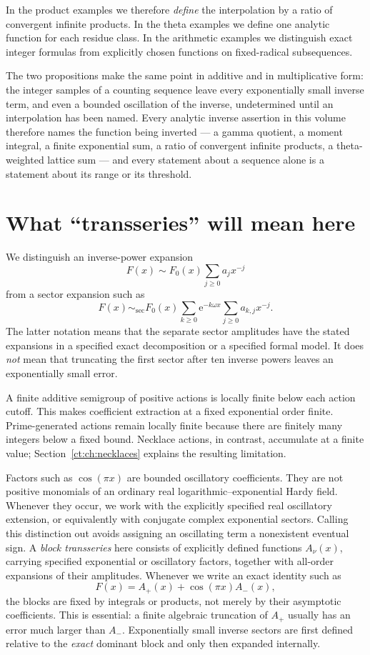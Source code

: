 \documentclass[11pt,openany]{book}
\numberwithin{equation}{chapter}
\theoremstyle{plain}
\theoremstyle{definition}
\theoremstyle{remark}
\newcommand{\ee}{\mathrm e}
\newcommand{\sectorsim}{\mathrel{\sim_{\mathrm{sec}}}}
\begin{document}
In the product examples we therefore \emph{define} the interpolation by a ratio of convergent infinite products. In the theta examples we define one analytic function for each residue class. In the arithmetic examples we distinguish exact integer formulas from explicitly chosen functions on fixed-radical subsequences.

The two propositions make the same point in additive and in multiplicative
form: the integer samples of a counting sequence leave every exponentially
small inverse term, and even a bounded oscillation of the inverse,
undetermined until an interpolation has been named.  Every analytic inverse
assertion in this volume therefore names the function being inverted --- a
gamma quotient, a moment integral, a finite exponential sum, a ratio of
convergent infinite products, a theta-weighted lattice sum --- and every
statement about a sequence alone is a statement about its range or its
threshold.

\section{What ``transseries'' will mean here}
\label{ct:sec:meaning}

We distinguish an inverse-power expansion
\[
 F(x)\sim F_0(x)\sum_{j\ge0}a_jx^{-j}
\]
from a sector expansion such as
\[
 F(x)\sectorsim F_0(x)\sum_{k\ge0}\ee^{-k\omega x}
       \sum_{j\ge0}a_{k,j}x^{-j}.
\]
The latter notation means that the separate sector amplitudes have the stated expansions in a specified exact decomposition or a specified formal model. It does \emph{not} mean that truncating the first sector after ten inverse powers leaves an exponentially small error.

A finite additive semigroup of positive actions is locally finite below each action cutoff. This makes coefficient extraction at a fixed exponential order finite. Prime-generated actions remain locally finite because there are finitely many integers below a fixed bound. Necklace actions, in contrast, accumulate at a finite value; Section~\ref{ct:ch:necklaces} explains the resulting limitation.

Factors such as $\cos(\pi x)$ are bounded oscillatory coefficients. They are not positive monomials of an ordinary real logarithmic--exponential Hardy field. Whenever they occur, we work with the explicitly specified real oscillatory extension, or equivalently with conjugate complex exponential sectors. Calling this distinction out avoids assigning an oscillating term a nonexistent eventual sign.
A \emph{block transseries} here consists of explicitly defined functions $A_\nu(x)$, carrying specified exponential or oscillatory factors, together with all-order expansions of their amplitudes. Whenever we write an exact identity such as
\[
 F(x)=A_+(x)+\cos(\pi x)A_-(x),
\]
the blocks are fixed by integrals or products, not merely by their asymptotic coefficients. This is essential: a finite algebraic truncation of $A_+$ usually has an error much larger than $A_-$. Exponentially small inverse sectors are first defined relative to the \emph{exact} dominant block and only then expanded internally.
\end{document}

